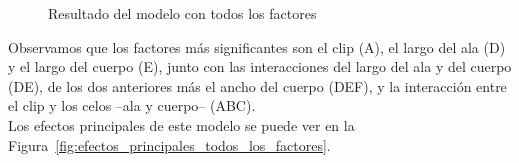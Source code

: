 \documentclass[12pt,a4paper,twoside,openright,titlepage,final]{article}
\begin{document}
\begin{figure}[htbp!]
	\centering
	\caption{Resultado del modelo con todos los factores} \label{fig:resultado_experimento_fraccional_1}
\end{figure}

Observamos que los factores más significantes son el clip (A), el largo del ala (D) y el largo del cuerpo (E), junto con las interacciones del largo del ala y del cuerpo (DE), de los dos anteriores más el ancho del cuerpo (DEF), y la interacción entre el clip y los celos --ala y cuerpo-- (ABC).\\

Los efectos principales de este modelo se puede ver en la Figura~\ref{fig:efectos_principales_todos_los_factores}.\\
\end{document}
